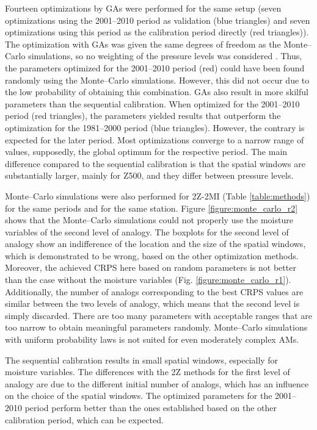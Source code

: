 \documentclass[gmdd]{copernicus}
\begin{document}
Fourteen optimizations by GAs were performed for the same setup (seven optimizations using the 2001--2010 period as validation (blue triangles) and seven optimizations using this period as the calibration period directly (red triangles)). The optimization with GAs was given the same degrees of freedom as the Monte--Carlo simulations, so no weighting of the pressure levels was considered \citep[as in][]{Horton2018a}. Thus, the parameters optimized for the 2001--2010 period (red) could have been found randomly using the Monte--Carlo simulations. However, this did not occur due to the low probability of obtaining this combination. GAs also result in more skilful parameters than the sequential calibration. When optimized for the 2001--2010 period (red triangles), the parameters yielded results that outperform the optimization for the 1981--2000 period (blue triangles). However, the contrary is expected for the later period. Most optimizations converge to a narrow range of values, supposedly, the global optimum for the respective period. The main difference compared to the sequential calibration is that the spatial windows are substantially larger, mainly for Z500, and they differ between pressure levels.  

Monte--Carlo simulations were also performed for 2Z-2MI (Table \ref{table:methods}) for the same periods and for the same station. Figure \ref{figure:monte_carlo_r2} shows that the Monte--Carlo simulations could not properly use the moisture variables of the second level of analogy. The boxplots for the second level of analogy show an indifference of the location and the size of the spatial windows, which is demonstrated to be wrong, based on the other optimization methods. Moreover, the achieved CRPS here based on random parameters is not better than the case without the moisture variables (Fig. \ref{figure:monte_carlo_r1}). Additionally, the number of analogs corresponding to the best CRPS values are similar between the two levels of analogy, which means that the second level is simply discarded. There are too many parameters with acceptable ranges that are too narrow to obtain meaningful parameters randomly. Monte--Carlo simulations with uniform probability laws is not suited for even moderately complex AMs. 

The sequential calibration results in small spatial windows, especially for moisture variables. The differences with the 2Z methods for the first level of analogy are due to the different initial number of analogs, which has an influence on the choice of the spatial windows. The optimized parameters for the 2001--2010 period perform better than the ones established based on the other calibration period, which can be expected.
\end{document}
